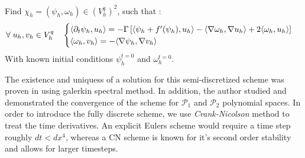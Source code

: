 \documentclass{article}
\begin{document}
\begin{mybox}{}
Find $\chi_h=(\psi_h,\omega_h)\in (V^q_h)^2$, such that :
\begin{equation}
   \forall \; u_h, v_h \in V^q_h  \quad   \begin{cases}
      \langle{\partial_t\psi_h},{u_h}\rangle=  -\Gamma \left[ \langle{\psi_h + f'(\psi_h)},{u_h}\rangle -\langle{\nabla \omega_h},{ \nabla u_h}\rangle +2 \langle{\omega_h},{u_h}\rangle  \right] \\
      \langle{\omega_h},{v_h}\rangle = -\langle{\nabla \psi_h},{ \nabla v_h}\rangle 
   \end{cases}
\end{equation}
With known initial conditions $\psi_h^{t=0}$ and $\omega_h^{t=0}$.
\end{mybox}
The existence and uniquess of a solution for this semi-discretized scheme was proven in \cite{qiNumericalAnalysisSecondorder2024} using galerkin spectral method. In addition, the author studied and demonstrated the convergence of the scheme for $\mathcal{P}_1$ and $\mathcal{P}_2$ polynomial spaces.
In order to introduce the fully discrete scheme, we use \emph{Crank-Nicolson} method to treat the time derivatives. An explicit Eulers scheme would require a time step roughly $dt<dx^4$, whereas a CN scheme is known for it's second order stability and allows for larger timesteps.
\end{document}
